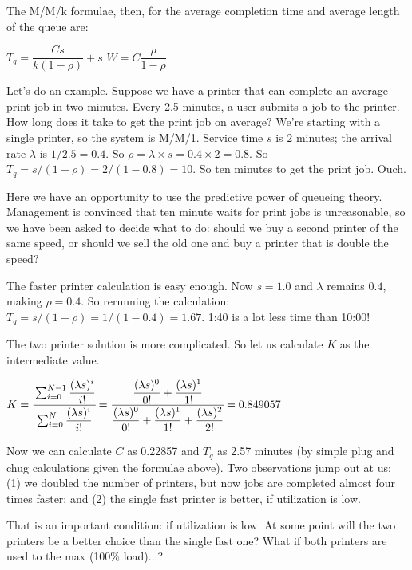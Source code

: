 The M/M/k formulae, then, for the average completion time and average length of the queue are:

\begin{center}
  $T_{q} = \dfrac{C s}{k(1 - \rho)} + s$ \qquad\qquad\qquad\qquad $W = C \dfrac{\rho}{1 - \rho}$
\end{center}

Let's do an example. Suppose we have a printer that can complete an average print job in two minutes. Every 2.5 minutes, a user submits a job to the printer. How long does it take to get the print job on average? We're starting with a single printer, so the system is M/M/1. Service time $s$ is 2 minutes; the arrival rate $\lambda$ is $1/2.5 = 0.4$. So $\rho = \lambda \times s = 0.4 \times 2 = 0.8$. So $T_{q} = s / (1 - \rho ) = 2 / (1 -0.8 ) = 10$. So ten minutes to get the print job. Ouch.

Here we have an opportunity to use the predictive power of queueing theory. Management is convinced that ten minute waits for print jobs is unreasonable, so we have been asked to decide what to do: should we buy a second printer of the same speed, or should we sell the old one and buy a printer that is double the speed?

The faster printer calculation is easy enough. Now $s = 1.0$ and $\lambda$ remains $0.4$, making $\rho = 0.4$. So rerunning the calculation: $T_{q} = s / (1 - \rho ) = 1 / (1 - 0.4 ) = 1.67$. 1:40 is a lot less time than 10:00! 

The two printer solution is more complicated. So let us calculate $K$ as the intermediate value. 

\begin{center}
	$K = \cfrac{\sum_{i=0}^{N-1}\dfrac{(\lambda s)^{i}}{i!}}{{\sum_{i=0}^{N}\dfrac{(\lambda s)^{i}}{i!}}} = \cfrac{\dfrac{(\lambda s)^{0}}{0!} + \dfrac{(\lambda s)^{1}}{1!}}{\dfrac{(\lambda s)^{0}}{0!} + \dfrac{(\lambda s)^{1}}{1!} + \dfrac{(\lambda s)^{2}}{2!}} = 0.849057$
	
\end{center}

Now we can calculate $C$ as 0.22857 and $T_{q}$ as 2.57 minutes (by simple plug and chug calculations given the formulae above). Two observations jump out at us: (1) we doubled the number of printers, but now jobs are completed almost four times faster; and (2) the single fast printer is better, if utilization is low.

That is an important condition: if utilization is low. At some point will the two printers be a better choice than the single fast one? What if both printers are used to the max (100\% load)...?

